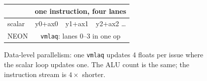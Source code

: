 \begin{figure}[htbp]
\centering
\begin{tabular}{lccc}
\toprule
& \multicolumn{3}{c}{one instruction, four lanes} \\
\midrule
scalar & y0+ax0 & y1+ax1 & y2+ax2 \dots \\
NEON   & \multicolumn{3}{c}{\texttt{vmlaq}: lanes 0--3 in one op} \\
\bottomrule
\end{tabular}
\caption{Data-level parallelism: one \texttt{vmlaq} updates 4 floats
per issue where the scalar loop updates one. The ALU count is the
same; the instruction stream is $4\times$ shorter.}
\label{fig:lanes16}
\end{figure}
